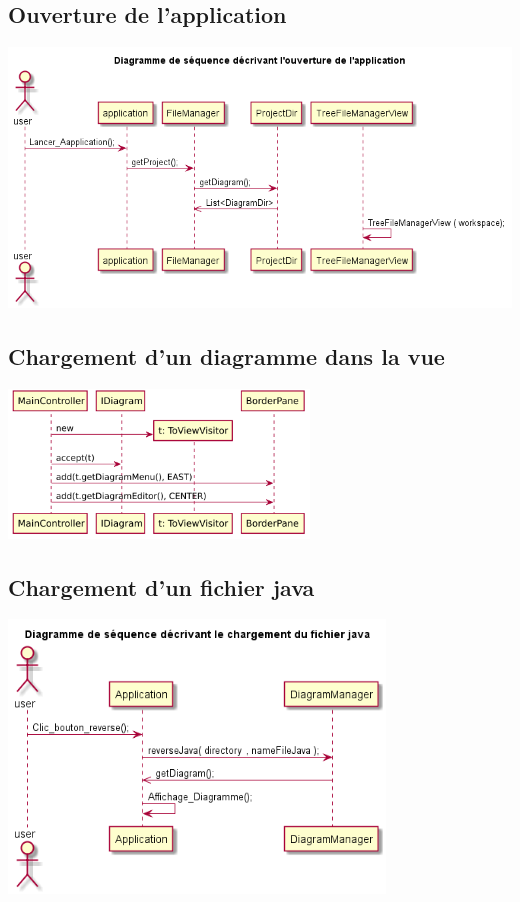 \documentclass[a4paper,10pt]{article}
\begin{document}
  \subsection{Ouverture de l'application}
  \begin{center}
	     \includegraphics[width=14cm]{Image/Diag_Seq_Open.png}
   \end{center}
    
   \subsection{Chargement d'un diagramme dans la vue}
   \begin{center}
	     \includegraphics[width=8cm]{Image/uiupdate.png}
   \end{center}
   
   \subsection{Chargement d'un fichier java}
    \begin{center}
	     \includegraphics[width=10cm]{Image/Charge_File_Java.png}
    \end{center}
  
\end{document}
